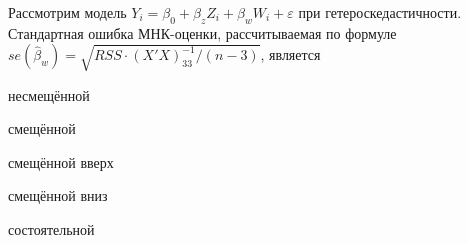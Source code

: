 
\begin{question}
Рассмотрим модель
\(Y_i= \beta_0 + \beta_z Z_{i} + \beta_w W_{i} + \varepsilon\) при
гетероскедастичности. Стандартная ошибка МНК-оценки, рассчитываемая по
формуле \(se(\hat\beta_w)=\sqrt{RSS \cdot (X'X)^{-1}_{33}/(n-3)}\),
является
\begin{answerlist}
  \item несмещённой
  \item смещённой
  \item смещённой вверх
  \item смещённой вниз
  \item состоятельной
\end{answerlist}
\end{question}


